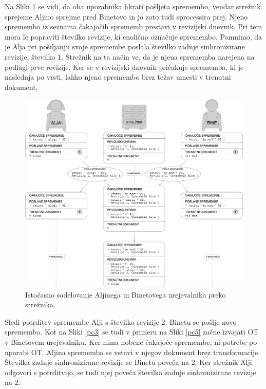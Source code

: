 \documentclass[a4paper, 12pt, twoside]{book}
\begin{document}
\pagebreak

Na Sliki \ref{pc4} se vidi, da oba uporabnika hkrati pošljeta spremembo, vendar strežnik sprejeme Aljino sprejme pred Binetovo in jo zato tudi sprocessira prej. Njeno spremembo iz seznama čakajočih sprememb prestavi v revizijski dnevnik. Pri tem mora le popraviti številko revizije, ki enolično označuje spremembo. Pomnimo, da je Alja pri pošiljanju svoje spremembe poslala številko zadnje sinhronizirane revizije, številko 1. Strežnik na ta način ve, da je njena sprememba narejena na podlagi prve revizije. Ker se v revizijski dnevnik pričakuje sprememba, ki je naslednja po vrsti, lahko njeno spremembo brez težav umesti v trenutni dokument.

\begin{figure}[placement h]
\begin{center}
\includegraphics[width=14cm]{pc4.png}
\end{center}
\caption{Istočasno sodelovanje Aljinega in Binetovega urejevalnika preko strežnika.}
\label{pc4}
\end{figure}

Sledi potrditev spremembe Alji s številko revizije 2. Binetu se pošlje novo spremembo. Kot na Sliki \ref{pc3} se tudi v primeru na Sliki \ref{pc5} začne izvajati OT v Binetovem urejevalniku. Ker nima nobene čakajoče spremembe, ni potrebe po uporabi OT. Aljina sprememba se vstavi v njegov dokument brez transformacije. Številka zadnje sinhronizirane revizije se Binetu poveča na 2. Ker strežnik Alji odgovori s potrditvijo, se tudi njej poveča številka zadnje sinhronizirane revizije na 2.
\end{document}
